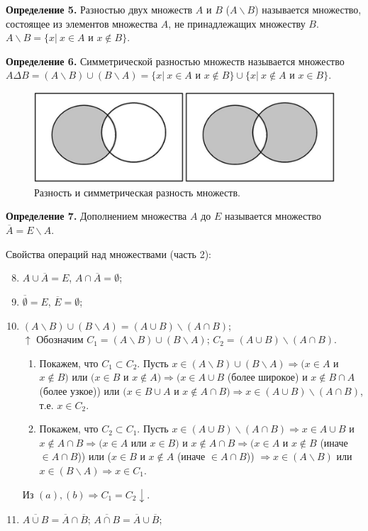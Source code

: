 \documentclass{article}
\begin{document}
    \textbf{Определение 5.} Разностью двух множеств $A$ и $B$ ($A \backslash B$) называется множество, состоящее из элементов множества $A$, не принадлежащих множеству $B$. $A \backslash B = \{x|\ x \in A \textrm{ и } x \not\in B\}$. 

    \textbf{Определение 6.} Симметрической разностью множеств называется множество $A \Delta B = (A \backslash B) \cup (B \backslash A) = \{x|\ x \in A \textrm{ и } x \not\in B\} \cup \{x|\ x \not\in A \textrm{ и } x \in B\}$. 

    \begin{figure}[h!]
    \centering
    \includegraphics{1_2}
    \caption{\label{fig:fig2}Разность и симметрическая разность множеств.}
    \end{figure}

    \textbf{Определение 7.} Дополнением множества $A$ до $E$ называется множество $\overline{A} = E \backslash A$.  

    Свойства операций над множествами (часть 2):
	\begin{enumerate}
        \setcounter{enumi}{7}
        \item $A \cup \overline{A} = E$, $A \cap \overline{A} = \emptyset$;
        \item $\overline{\emptyset} = E$, $\overline{E} = \emptyset$;
        \item $(A \backslash B) \cup (B \backslash A) = (A \cup B) \backslash (A \cap B)$;\\
        $\uparrow$ Обозначим $C_1 = (A \backslash B) \cup (B \backslash A)$; $C_2 = (A \cup B) \backslash (A \cap B)$.
        \begin{enumerate}
            \item Покажем, что $C_1 \subset C_2$. Пусть $x \in (A \backslash B) \cup (B \backslash A) \Rightarrow (x \in A$ и $x \not\in B)$ или $(x \in B$ и $x \not\in A) \Rightarrow (x \in A \cup B$ (более широкое) и $x \not\in B \cap A$ (более узкое)) или $(x \in B \cup A$ и $x \not\in A \cap B) \Rightarrow x \in (A \cup B) \backslash (A \cap B)$, т.е. $x \in C_2$.
            \item Покажем, что $C_2 \subset C_1$. Пусть $x \in (A \cup B) \backslash (A \cap B) \Rightarrow x \in A \cup B$ и $x \not\in A \cap B \Rightarrow (x \in A$ или $x \in B)$ и $x \not\in A \cap B \Rightarrow (x \in A$ и $x \not\in B$ (иначе $\in A \cap B$)) или ($x \in B$ и $x \not\in A$ (иначе $\in A \cap B$)) $\Rightarrow x \in (A \backslash B)$ или $x \in (B \backslash A) \Rightarrow x \in C_1$.
        \end{enumerate}
        Из $(a),(b) \Rightarrow C_1 = C_2 \downarrow.$ 
        \item $\overline{A \cup B} = \overline{A}\cap\overline{B}$; $\overline{A \cap B} = \overline{A}\cup\overline{B}$;
    \end{enumerate}
\end{document}
